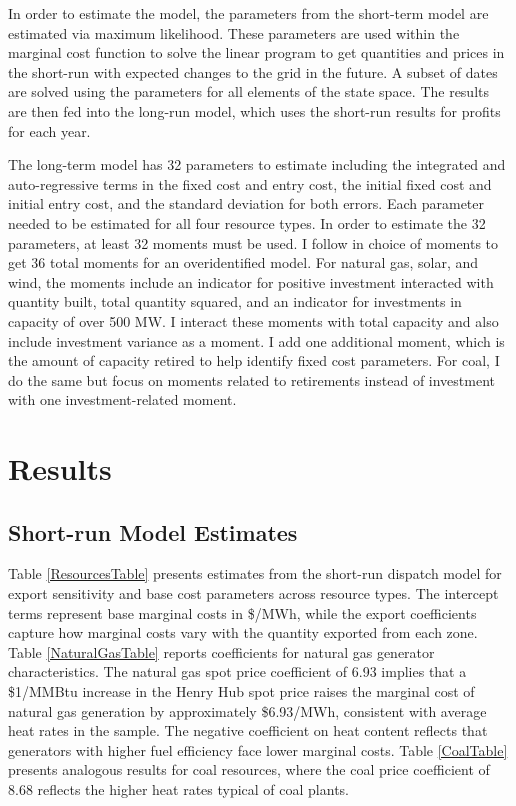 \documentclass[12pt]{article}
\begin{document}
In order to estimate the model, the parameters from the short-term model are estimated via maximum likelihood. These parameters are used within the marginal cost function to solve the linear program to get quantities and prices in the short-run with expected changes to the grid in the future. A subset of dates are solved using the parameters for all elements of the state space. The results are then fed into the long-run model, which uses the short-run results for profits for each year.

The long-term model has 32 parameters to estimate including the integrated and auto-regressive terms in the fixed cost and entry cost, the initial fixed cost and initial entry cost, and the standard deviation for both errors. Each parameter needed to be estimated for all four resource types. In order to estimate the 32 parameters, at least 32 moments must be used. I follow \cite{gowrisankaran2024energy} in choice of moments to get 36 total moments for an overidentified model. For natural gas, solar, and wind, the moments include an indicator for positive investment interacted with quantity built, total quantity squared, and an indicator for investments in capacity of over 500 MW. I interact these moments with total capacity and also include investment variance as a moment. I add one additional moment, which is the amount of capacity retired to help identify fixed cost parameters. For coal, I do the same but focus on moments related to retirements instead of investment with one investment-related moment.


\section{Results} \label{sec:result}

\subsection{Short-run Model Estimates}

Table \ref{ResourcesTable} presents estimates from the short-run dispatch model for export sensitivity and base cost parameters across resource types. The intercept terms represent base marginal costs in \$/MWh, while the export coefficients capture how marginal costs vary with the quantity exported from each zone. Table \ref{NaturalGasTable} reports coefficients for natural gas generator characteristics. The natural gas spot price coefficient of 6.93 implies that a \$1/MMBtu increase in the Henry Hub spot price raises the marginal cost of natural gas generation by approximately \$6.93/MWh, consistent with average heat rates in the sample. The negative coefficient on heat content reflects that generators with higher fuel efficiency face lower marginal costs. Table \ref{CoalTable} presents analogous results for coal resources, where the coal price coefficient of 8.68 reflects the higher heat rates typical of coal plants.
\end{document}
